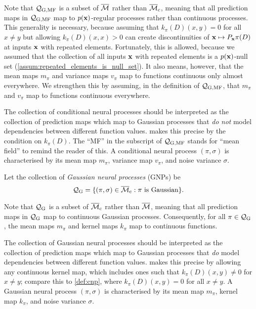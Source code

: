 \documentclass[12pt, twoside]{report}
\begin{document}
Note that $\Qc\ss{G,MF}$ is a subset of $\overline{\mathcal{M}}$ rather than $\overline{\M}\ss{c}$, meaning that all prediction maps in $\Qc\ss{G,MF}$ map to $p(\mathbf{x})$-regular processes rather than continuous processes.
This generality is necessary, because assuming that $k_\pi(D)(x, y) = 0$ for all $x \neq y$ but allowing $k_\pi(D)(x, x) > 0$ can create discontinuities of $\mathbf{x} \mapsto P_{\mathbf{x}} \pi(D)$ at inputs $\mathbf{x}$ with repeated elements.
Fortunately, this is allowed, because we assumed that the collection of all inputs $\mathbf{x}$ with repeated elements is a $p(\mathbf{x})$-null set (\cref{assum:repeated_elements_is_null_set}).
It also means, however, that the mean maps $m_\pi$ and variance maps $v_\pi$ map to functions continuous only almost everywhere.
We strengthen this by assuming, in the definition of $\Qc\ss{G,MF}$, that $m_\pi$ and $v_\pi$ map to functions continuous everywhere.

The collection of conditional neural processes should be interpreted as the collection of prediction maps which map to Gaussian processes that \emph{do not} model dependencies between different function values.
 makes this precise by the condition on $k_\pi(D)$.
The ``MF'' in the subscript of $\Qc\ss{G,MF}$ stands for ``mean field'' to remind the reader of this.
A conditional neural process $(\pi, \sigma)$ is characterised by its mean map $m_\pi$, variance map $v_\pi$, and noise variance $\sigma$.

\begin{definition}
    \label{def:gnp}
    Let the collection of \emph{Gaussian neural processes} (GNPs) be
    \begin{equation}
        \Qc\ss{G} = \set{(\pi, \sigma) \in \overline{\M}\ss{c}
            :
            \begin{gathered}
                \text{\normalshape $\pi$ is Gaussian}
            \end{gathered}
        }.
    \end{equation}
\end{definition}

Note that $\Qc\ss{G}$ is a subset of $\overline{\M}\ss{c}$ rather than $\overline{\mathcal{M}}$, meaning that all prediction maps in $\Qc\ss{G}$ map to continuous Gaussian processes.
Consequently, for all $\pi \in \Qc\ss{G}$, the mean maps $m_\pi$ and kernel maps $k_\pi$ map to continuous functions.

The collection of Gaussian neural processes should be interpreted as the collection of prediction maps which map to Gaussian processes that \emph{do} model dependencies between different function values.
 makes this precise by allowing any continuous kernel map, which includes ones such that $k_\pi(D)(x, y) \neq 0$ for $x \neq y$;
compare this to \cref{def:cnp}, where $k_\pi(D)(x, y) = 0$ for all $x \neq y$.
A Gaussian neural process $(\pi, \sigma)$ is characterised by its mean map $m_\pi$, kernel map $k_\pi$, and noise variance $\sigma$.
\end{document}
